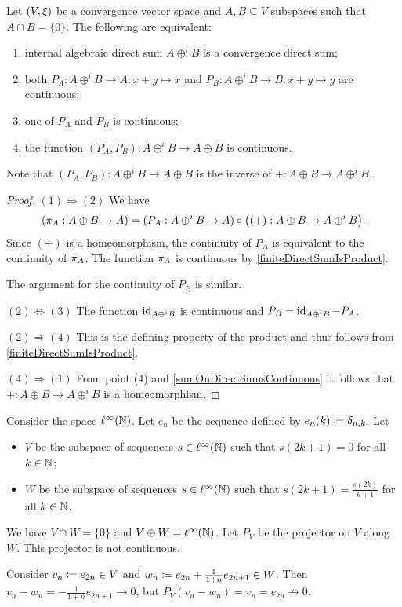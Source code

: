 \begin{proposition} \label{internalConvergenceDirectSumEquivalents}
Let $\sSet{V,\xi}$ be a convergence vector space and $A,B\subseteq V$ subspaces such that $A\cap B = \{0\}$. The following are equivalent:
\begin{enumerate}
\item internal algebraic direct sum $A\oplus^i B$ is a convergence direct sum;
\item both $P_A: A\oplus^i B \to A: x+y \mapsto x$ and $P_B: A\oplus^i B \to B: x+y \mapsto y$ are continuous;
\item one of $P_A$ and $P_B$ is continuous;
\item the function $(P_A, P_B): A\oplus^i B \to A\oplus B$ is continuous.
\end{enumerate}
\end{proposition}
Note that $(P_A, P_B): A\oplus^i B \to A\oplus B$ is the inverse of $+: A\oplus B \to A\oplus^i B$.
\begin{proof}
$(1) \Rightarrow (2)$ We have
\[ (\pi_A: A\oplus B \to A) = (P_A: A\oplus^i B \to A)\circ \big((+): A\oplus B \to A\oplus^i B\big). \]
Since $(+)$ is a homeomorphism, the continuity of $P_A$ is equivalent to the continuity of $\pi_A$. The function $\pi_A$ is continuous by \ref{finiteDirectSumIsProduct}.

The argument for the continuity of $P_B$ is similar.

$(2) \Leftrightarrow (3)$ The function $\operatorname{id}_{A\oplus^i B}$ is continuous and $P_B = \operatorname{id}_{A\oplus^i B} - P_A$.

$(2) \Rightarrow (4)$ This is the defining property of the product and thus follows from \ref{finiteDirectSumIsProduct}.

$(4) \Rightarrow (1)$ From point (4) and \ref{sumOnDirectSumsContinuous} it follows that $+: A\oplus B \to A\oplus^i B$ is a homeomorphism.
\end{proof}

\begin{example}
Consider the space $\ell^\infty(\mathbb{N})$. Let $e_n$ be the sequence defined by $e_n(k) \coloneqq \delta_{n,k}$. Let
\begin{itemize}
\item $V$ be the subspace of sequences $s\in \ell^\infty(\mathbb{N})$ such that $s(2k+1) = 0$ for all $k\in \mathbb{N}$;
\item $W$ be the subspace of sequences $s\in \ell^\infty(\mathbb{N})$ such that $s(2k+1) = \frac{s(2k)}{k+1}$ for all $k\in \mathbb{N}$.
\end{itemize}
We have $V\cap W = \{0\}$ and $V\oplus W = \ell^\infty(\mathbb{N})$.
Let $P_V$ be the projector on $V$ along $W$. This projector is not continuous.

Consider $v_n \coloneqq e_{2n} \in V$ and $w_n \coloneqq e_{2n}+ \frac{1}{1+n}e_{2n+1}\in W$.
Then $v_n - w_n = -\frac{1}{1+n}e_{2n+1} \to 0$, but $P_V(v_n-w_n) = v_n = e_{2n} \not\to 0$.
\end{example}

